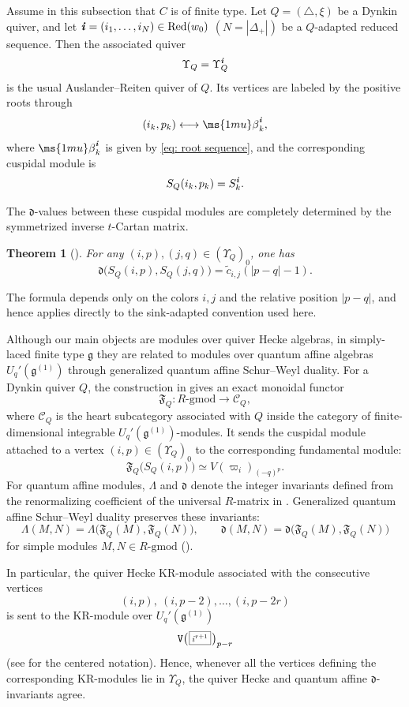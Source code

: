 \documentclass[12pt, leqno]{amsart}
\numberwithin{equation}{section}
\theoremstyle{plain}
\newtheorem{theorem}[lemma]{Theorem}
\theoremstyle{definition}
\newcommand{\Vkm}[1]{%
  \ttV\bigl(\hspace{0.2ex}\scalebox{.8}{\(\boxed{#1}\)}\hspace{0.2ex}\bigr)%
}
\newcommand{\g}{\mathfrak{g}}
\newcommand{\be}{{\ms{1mu}\beta}}
\newcommand{\de}{\mathfrak{d}}
\newcommand{\Dynkin}{\triangle}
\newcommand{\ii}{ \textbf{\textit{i}}}
\newcommand{\tc}{\widetilde{c}}
\newcommand{\frakF}{\mathfrak{F}}
\newcommand{\scrC}{\mathscr{C}}
\newcommand{\ttV}{\mathtt{V}}
\newcommand{\Red}{\mathrm{Red}}
\begin{document}
Assume in this subsection that \(C\) is of finite type.  Let
$Q=(\Dynkin,\xi)$ be a Dynkin quiver, and let
$\ii=(i_1,\ldots,i_N)\in\Red(w_0)$ $(N=|\Delta_+|)$
be a \(Q\)-adapted reduced sequence.  Then the associated quiver
\[
\Upsilon_Q=\Upsilon_Q^\ii
\]
is the usual Auslander--Reiten quiver of \(Q\).  Its vertices are
labeled by the positive roots through
\[
(i_k,p_k)\longleftrightarrow\be_k^\ii,
\]
where \(\be_k^\ii\) is given by \eqref{eq: root sequence},
and the corresponding cuspidal module is
\[
S_Q(i_k,p_k)=S_k^\ii.
\]

The \(\de\)-values between these cuspidal modules are completely
determined by the symmetrized inverse \(t\)-Cartan matrix.

\begin{theorem}[{\cite[Theorem~8.2]{KO24}}]
\label{thm: finite-type cuspidal d-values}
For any $(i,p),(j,q)\in(\Upsilon_Q)_0$,
one has
\[
\de\bigl(S_Q(i,p),S_Q(j,q)\bigr) = \tc_{i,j}(|p-q|-1).
\]
\end{theorem}


 

The formula depends only on the colors \(i,j\) and the relative
position \(|p-q|\), and hence applies directly to the sink-adapted
convention used here.

Although our main objects are modules over quiver Hecke algebras,
in simply-laced finite type $\g$ they are related to modules over quantum affine algebras $U_q'(\g^{(1)})$
through generalized quantum affine Schur--Weyl duality.
For a Dynkin quiver \(Q\), the construction in
\cite{KKK2,KKK18,KKKOIV} gives an exact monoidal functor
\[
\frakF_Q: R\text{-gmod} \longrightarrow \scrC_Q,
\]
where \(\scrC_Q\) is the heart subcategory associated with \(Q\)
inside the category of finite-dimensional integrable 
\(U_q'(\g^{(1)})\)-modules.  It sends the cuspidal module attached
to a vertex \((i,p)\in(\Upsilon_Q)_0\) to the corresponding
fundamental module:
\[
\frakF_Q\bigl(S_Q(i,p)\bigr)
\simeq
V(\varpi_i)_{(-q)^p}.
\]
For quantum affine modules, \(\Lambda\) and \(\de\) denote the
integer invariants defined from the renormalizing coefficient of the
universal \(R\)-matrix in \cite[Definition~2.10]{KKOP23P}.
Generalized quantum affine Schur--Weyl duality preserves these invariants:
\[
\Lambda(M,N)
=
\Lambda\bigl(\frakF_Q(M),\frakF_Q(N)\bigr),
\qquad
\de(M,N)
=
\de\bigl(\frakF_Q(M),\frakF_Q(N)\bigr)
\]
for simple modules \(M,N\in R\text{-gmod}\)
(\cite[Theorem~4.12]{KKOP23P}).   

In particular, the quiver Hecke KR-module associated with the
consecutive vertices
\[
(i,p),\ (i,p-2),\ldots,(i,p-2r)
\]
is sent to the KR-module over $U_q'(\g^{(1)})$
\[
\Vkm{i^{r+1}}_{p-r}
\]
(see \cite{OS25} for the centered notation).  Hence, whenever all the
vertices defining the corresponding KR-modules lie in \(\Upsilon_Q\),
the quiver Hecke and quantum affine \(\de\)-invariants agree.  
\end{document}
